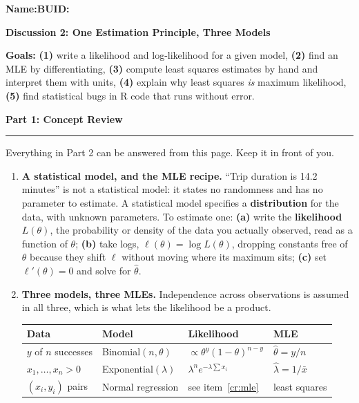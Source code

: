 \documentclass[11pt]{article}
\newcommand{\blankline}[1]{\underline{\hspace{#1}}}
\newcommand{\parttitle}[1]{%
  \par\medskip\noindent
  {\large\bfseries #1}\par
  \vspace{-.5em}\noindent\rule{\linewidth}{0.4pt}\par\smallskip}
\begin{document}
\noindent\textbf{Name:}\blankline{2.3in}\hfill\textbf{BUID:}\blankline{1.6in}

\begin{center}
  {\Large\bfseries Discussion 2: One Estimation Principle, Three Models}
\end{center}

\noindent\textbf{Goals:} \textbf{(1)} write a likelihood and log-likelihood for a given model,
\textbf{(2)} find an MLE by differentiating, \textbf{(3)} compute least squares estimates by hand
and interpret them with units, \textbf{(4)} explain why least squares \emph{is} maximum
likelihood, \textbf{(5)} find statistical bugs in R code that runs without error.

\parttitle{Part 1: Concept Review}

{\small

\noindent Everything in Part 2 can be answered from this page. Keep it in front of you.

\begin{enumerate}[label=\textbf{\arabic*.}, ref=\arabic*, wide=0pt, itemsep=.55em, topsep=.5em]

\item \textbf{A statistical model, and the MLE recipe.} ``Trip duration is 14.2 minutes'' is not a
statistical model: it states no randomness and has no parameter to estimate. A statistical model
specifies a \textbf{distribution} for the data, with unknown parameters. To estimate one:
\textbf{(a)} write the \textbf{likelihood} $L(\theta)$, the probability or density of the data you
actually observed, read as a function of $\theta$; \textbf{(b)} take logs,
$\ell(\theta) = \log L(\theta)$, dropping constants free of $\theta$ because they shift $\ell$
without moving where its maximum sits; \textbf{(c)} set $\ell'(\theta) = 0$ and solve for
$\hat\theta$.

\item \textbf{Three models, three MLEs.} Independence across observations is assumed in all three,
which is what lets the likelihood be a product.

\begin{center}
\renewcommand{\arraystretch}{1.15}
\begin{tabular}{llll}
\toprule
\textbf{Data} & \textbf{Model} & \textbf{Likelihood} & \textbf{MLE} \\
\midrule
$y$ of $n$ successes & Binomial$(n,\theta)$ & $\propto \theta^{y}(1-\theta)^{n-y}$ & $\hat\theta = y/n$ \\
$x_1,\dots,x_n > 0$ & Exponential$(\lambda)$ & $\lambda^{n}e^{-\lambda\sum x_i}$ & $\hat\lambda = 1/\bar{x}$ \\
$(x_i, y_i)$ pairs & Normal regression & see item~\ref{cr:mle} & least squares \\
\bottomrule
\end{tabular}
\end{center}


\end{enumerate}}
\end{document}
